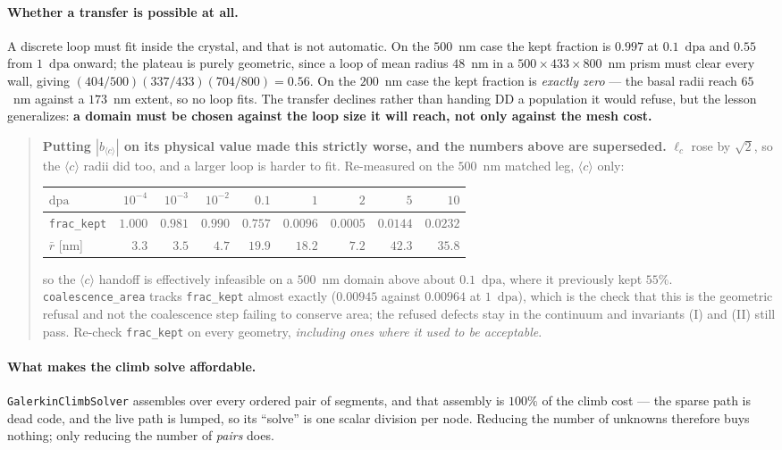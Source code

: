 \documentclass[11pt,a4paper]{article}
\newcommand{\code}[1]{\texttt{\small #1}}
\newcommand{\dpa}{\ensuremath{\mathrm{dpa}}}
\newcommand{\cloop}{\ensuremath{\langle c\rangle}}
\begin{document}
\paragraph{Whether a transfer is possible at all.} A discrete loop must fit
inside the crystal, and that is not automatic. On the $500$~nm case the kept
fraction is $0.997$ at $0.1$~\dpa{} and $0.55$ from $1$~\dpa{} onward; the
plateau is purely geometric, since a loop of mean radius $48$~nm in a
$500\times433\times800$~nm prism must clear every wall, giving
$(404/500)(337/433)(704/800) = 0.56$. On the $200$~nm case the kept fraction is
\emph{exactly zero} --- the basal radii reach $65$~nm against a $173$~nm extent,
so no loop fits. The transfer declines rather than handing DD a population it
would refuse, but the lesson generalizes: \textbf{a domain must be chosen
against the loop size it will reach, not only against the mesh cost.}

\begin{quote}
\textbf{Putting $|b_{\cloop{}}|$ on its physical value made this strictly worse,
and the numbers above are superseded.} $\ell_c$ rose by $\sqrt2$, so the
\cloop{} radii did too, and a larger loop is harder to fit. Re-measured on the
$500$~nm matched leg, \cloop{} only:
%
\begin{center}
\begin{tabular}{@{}lrrrrrrrr@{}}
\toprule
\dpa{}              & $10^{-4}$ & $10^{-3}$ & $10^{-2}$ & $0.1$ & $1$ & $2$ & $5$ & $10$ \\
\midrule
\code{frac\_kept}   & $1.000$ & $0.981$ & $0.990$ & $0.757$ & $0.0096$ & $0.0005$ & $0.0144$ & $0.0232$ \\
$\bar r$ [nm]       & $3.3$ & $3.5$ & $4.7$ & $19.9$ & $18.2$ & $7.2$ & $42.3$ & $35.8$ \\
\bottomrule
\end{tabular}
\end{center}
%
so the \cloop{} handoff is effectively infeasible on a $500$~nm domain above
about $0.1$~\dpa{}, where it previously kept $55\%$. \code{coalescence\_area}
tracks \code{frac\_kept} almost exactly ($0.00945$ against $0.00964$ at
$1$~\dpa{}), which is the check that this is the geometric refusal and not the
coalescence step failing to conserve area; the refused defects stay in the
continuum and invariants (I) and (II) still pass. Re-check \code{frac\_kept} on
every geometry, \emph{including ones where it used to be acceptable}.
\end{quote}

\paragraph{What makes the climb solve affordable.} \code{GalerkinClimbSolver}
assembles over every ordered pair of segments, and that assembly is $100\%$ of
the climb cost --- the sparse path is dead code, and the live path is lumped, so
its ``solve'' is one scalar division per node. Reducing the number of unknowns
therefore buys nothing; only reducing the number of \emph{pairs} does.
\end{document}
